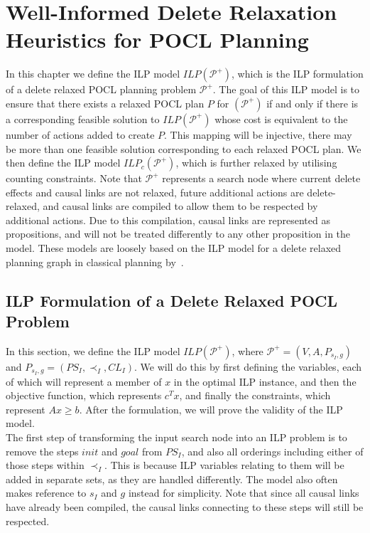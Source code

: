 \chapter{Well-Informed Delete Relaxation Heuristics for POCL Planning}\label{chap:heuristic}

In this chapter we define the ILP model $\mathit{ILP}(\mathcal{P}^+)$, which is the ILP formulation of a delete relaxed POCL planning problem $\mathcal{P}^+$. The goal of this ILP model is to ensure that there exists a relaxed POCL plan $P$ for $(\mathcal{P}^+)$ if and only if there is a corresponding feasible solution to $\mathit{ILP}(\mathcal{P}^+)$ whose cost is equivalent to the number of actions added to create $P$. This mapping will be injective, there may be more than one feasible solution corresponding to each relaxed POCL plan. We then define the ILP model $\mathit{ILP_c}(\mathcal{P}^+)$, which is further relaxed by utilising counting constraints. Note that $\mathcal{P}^+$ represents a search node where current delete effects and causal links are not relaxed, future additional actions are delete-relaxed, and causal links are compiled to allow them to be respected by additional actions. Due to this compilation, causal links are represented as propositions, and will not be treated differently to any other proposition in the model. These models are loosely based on the ILP model for a delete relaxed planning graph in classical planning by~\cite{Imai2015ILPDeleteRelaxedPlanning}.\\

\section{ILP Formulation of a Delete Relaxed POCL Problem}

In this section, we define the ILP model $\mathit{ILP}(\mathcal{P}^+)$, where $\mathcal{P}^+=(V, A, P_{s_I,g})$ and $P_{s_I,g}=(PS_I,\prec_I,CL_I)$. We will do this by first defining the variables, each of which will represent a member of $x$ in the optimal ILP instance, and then the objective function, which represents $c^Tx$, and finally the constraints, which represent $Ax\geq b$. After the formulation, we will prove the validity of the ILP model.\\


The first step of transforming the input search node into an ILP problem is to remove the steps $\mathit{init}$ and $\mathit{goal}$ from $PS_I$, and also all orderings including either of those steps within $\prec_I$. This is because ILP variables relating to them will be added in separate sets, as they are handled differently. The model also often makes reference to $s_I$ and $g$ instead for simplicity. Note that since all causal links have already been compiled, the causal links connecting to these steps will still be respected.\\


